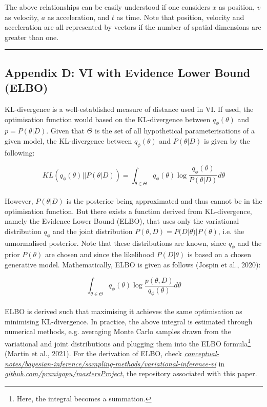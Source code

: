 \documentclass[conference]{IEEEtran}
\begin{document}
The above relationships can be easily understood if one considers $x$ as position, $v$ as velocity, $a$ as acceleration, and $t$ as time. Note that position, velocity and acceleration are all represented by vectors if the number of spatial dimensions are greater than one.

\par\noindent\rule{0.49\textwidth}{0.1pt}

\subsection*{Appendix D: VI with Evidence Lower Bound (ELBO)}
KL-divergence is a well-established measure of distance used in VI. If used, the optimisation function would based on the KL-divergence between $q_\phi(\theta)$ and $p = P(\theta|D)$. Given that $\Theta$ is the set of all hypothetical parameterisations of a given model, the KL-divergence between $q_\phi(\theta)$ and $P(\theta|D)$ is given by the following:

\begin{equation*}
	KL(q_\phi(\theta) || P(\theta|D))
	= \int_{\theta \in \Theta} q_\phi(\theta) \log \frac{q_\phi(\theta)}{P(\theta|D)} d\theta
\end{equation*}\\

However, $P(\theta|D)$ is the posterior being approximated and thus cannot be in the optimisation function. But there exists a function derived from KL-divergence, namely the Evidence Lower Bound (ELBO), that uses only the variational distribution $q_\phi$ and the joint distribution $P(\theta, D) = P(D|\theta)|P(\theta)$, i.e. the unnormalised posterior. Note that these distributions are known, since $q_\phi$ and the prior $P(\theta)$ are chosen and since the likelihood $P(D|\theta)$ is based on a chosen generative model. Mathematically, ELBO is given as follows (Jospin et al., 2020):

\begin{equation*}
	\int_{\theta \in \Theta} q_\phi(\theta) \log \frac{p(\theta, D)}{q_\phi(\theta)} d\theta
\end{equation*}\\

ELBO is derived such that maximising it achieves the same optimisation as minimising KL-divergence. In practice, the above integral is estimated through numerical methods, e.g. averaging Monte Carlo samples drawn from the variational and joint distributions and plugging them into the ELBO formula\footnote{Here, the integral becomes a summation.} (Martin et al., 2021). For the derivation of ELBO, check \href{https://github.com/pranigopu/mastersProject/tree/main/conceptual-notes/bayesian-inference/sampling-methods/variational-inference-vi}{\textit{conceptual-notes/bayesian-inference/sampling-methods/variational-inference-vi}} in \href{https://github.com/pranigopu/mastersProject}{\textit{github.com/pranigopu/mastersProject}}, the repository associated with this paper.
\end{document}
